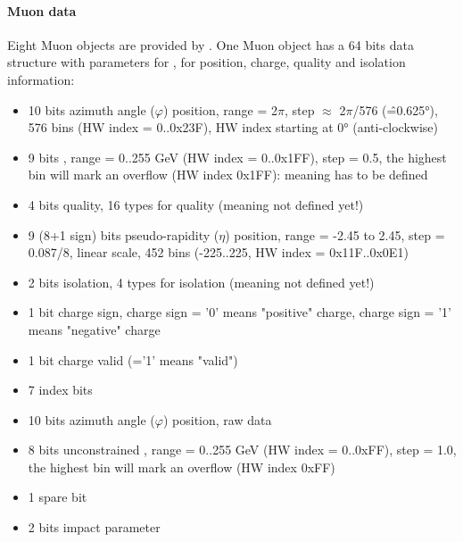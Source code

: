 \paragraph{Muon data}
\label{sec:gtl:muon_data}
Eight Muon objects are provided by \gmt. One Muon object has a 64 bits data structure with parameters for \pt, for position, charge, quality and isolation information: 
\begin{itemize}
\item 10 bits azimuth angle ($\varphi$) position, range = 2$\pi$, step $\approx$ 2$\pi$/576 (\^=0.625°), 576 bins (HW index = 0..0x23F), HW index starting at 0° (anti-clockwise)
\item 9 bits \pt, range = 0..255 GeV (HW index = 0..0x1FF), step = 0.5, the highest bin will mark an overflow (HW index 0x1FF): meaning has to be defined
\item 4 bits quality, 16 types for quality (meaning not defined yet!)
\item 9 (8+1 sign) bits pseudo-rapidity ($\eta$) position, range = -2.45 to 2.45, step = 0.087/8, linear scale, 452 bins (-225..225, HW index = 0x11F..0x0E1)
\item 2 bits isolation, 4 types for isolation (meaning not defined yet!)
\item 1 bit charge sign, charge sign = '0' means "positive" charge, charge sign = '1' means "negative" charge
\item 1 bit charge valid (='1' means "valid")
\item 7 index bits
\item 10 bits azimuth angle ($\varphi$) position, raw data
\item 8 bits unconstrained \pt, range = 0..255 GeV (HW index = 0..0xFF), step = 1.0, the highest bin will mark an overflow (HW index 0xFF)
\item 1 spare bit
\item 2 bits impact parameter
\end{itemize}

